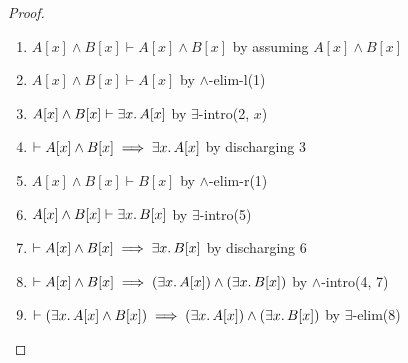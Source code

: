 \begin{proof}
\begin{enumerate}
\item $A[x]\land B[x]\vdash A[x]\land B[x]$ 
  by assuming $A[x]\land B[x]$%
\item $A[x]\land B[x]\vdash A[x]$ by $\land$-elim-l(1)%
\item $A[x]\land B[x]\vdash \exists x\ldotp A[x]$ by $\exists$-intro(2, $x$)%
\item $\vdash A[x]\land B[x]\implies\exists x\ldotp A[x]$ by
  discharging 3%
\item $A[x]\land B[x]\vdash B[x]$ by $\land$-elim-r(1)%
\item $A[x]\land B[x]\vdash \exists x\ldotp  B[x]$ by $\exists$-intro(5)%
\item $\vdash A[x]\land B[x]\implies \exists x\ldotp  B[x]$ by
  discharging 6%
\item $\vdash A[x]\land B[x]\implies(\exists x\ldotp A[x])\land(\exists x\ldotp B[x])$
  by $\land$-intro(4, 7)%
\item $\vdash(\exists x\ldotp A[x]\land B[x])\implies(\exists x\ldotp A[x])\land(\exists x\ldotp B[x])$
  by $\exists$-elim(8)\qedhere
\end{enumerate}
\end{proof}

